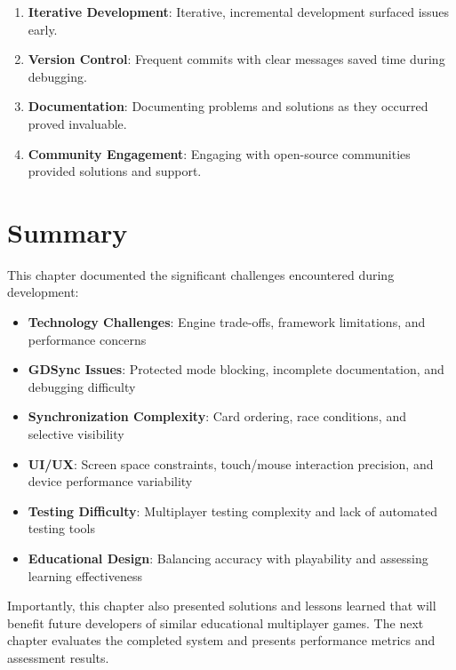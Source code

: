 \begin{enumerate}
    \item \textbf{Iterative Development}: Iterative, incremental development surfaced issues early.

    \item \textbf{Version Control}: Frequent commits with clear messages saved time during debugging.

    \item \textbf{Documentation}: Documenting problems and solutions as they occurred proved invaluable.

    \item \textbf{Community Engagement}: Engaging with open-source communities provided solutions and support.
\end{enumerate}

\section{Summary}
\label{sec:problems-summary}

This chapter documented the significant challenges encountered during development:

\begin{itemize}
    \item \textbf{Technology Challenges}: Engine trade-offs, framework limitations, and performance concerns
    \item \textbf{GDSync Issues}: Protected mode blocking, incomplete documentation, and debugging difficulty
    \item \textbf{Synchronization Complexity}: Card ordering, race conditions, and selective visibility
    \item \textbf{UI/UX}: Screen space constraints, touch/mouse interaction precision, and device performance variability
    \item \textbf{Testing Difficulty}: Multiplayer testing complexity and lack of automated testing tools
    \item \textbf{Educational Design}: Balancing accuracy with playability and assessing learning effectiveness
\end{itemize}

Importantly, this chapter also presented solutions and lessons learned that will benefit future developers of similar educational multiplayer games. The next chapter evaluates the completed system and presents performance metrics and assessment results.
